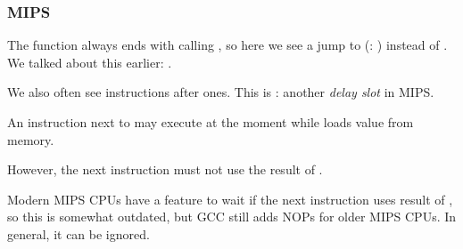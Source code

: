 \subsubsection{MIPS}




The function always ends with calling \puts, so here we see a jump to \puts (: ) instead of .
We talked about this earlier: .

We also often see  instructions after  ones.
This is : another \emph{delay slot} in MIPS.

An instruction next to  may execute at the moment while  loads value from memory. 

However, the next instruction must not use the result of .

Modern MIPS CPUs have a feature to wait if the next instruction uses result of , so this is somewhat outdated,
but GCC still adds NOPs for older MIPS CPUs.
In general, it can be ignored.
